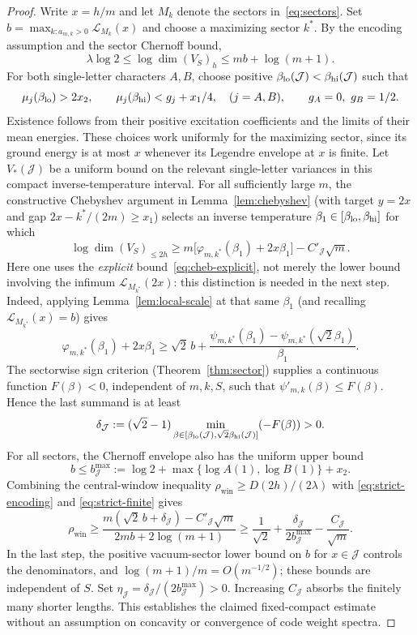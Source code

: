\documentclass[10pt,a4paper]{article}
\numberwithin{equation}{section}
\theoremstyle{remark}\newtheorem{remark}[theorem]{Remark}\newtheorem{question}[theorem]{Question}
\newcommand{\rhow}{\rho_{\mathrm{win}}}\newcommand{\F}{\mathbb F}\newcommand{\K}{\mathbb K}\newcommand{\Z}{\mathbb Z}\newcommand{\R}{\mathbb R}\newcommand{\cB}{\mathcal L}\newcommand{\wt}{\mathrm{wt}}\newcommand{\dimn}{\operatorname{dim}}\newcommand{\supp}{\operatorname{supp}}
\begin{document}
\begin{proof}
Write $x=h/m$ and let $M_k$ denote the sectors in~\eqref{eq:sectors}. Set
$b=\max_{k:a_{m,k}>0}\cB_{M_k}(x)$ and choose a maximizing
sector $k^*$. By the encoding assumption and the sector Chernoff bound,
\begin{equation}\label{eq:strict-encoding}
\lambda\log2\le\log\dimn(V_S)_h
\le m b+\log(m+1).
\end{equation}
For both single-letter characters $A,B$, choose positive
$\beta_{\rm lo}(\mathcal J)<\beta_{\rm hi}(\mathcal J)$ such that
\[
\mu_j(\beta_{\rm lo})>2x_2,\qquad
\mu_j(\beta_{\rm hi})<g_j+x_1/4,
\quad (j=A,B),\qquad g_A=0,\ g_B=1/2.
\]
Existence follows from their positive excitation coefficients and the
limits of their mean energies. These choices work uniformly for the
maximizing sector, since its ground energy is at most $x$ whenever
its Legendre envelope at $x$ is finite. Let $V_*(\mathcal J)$ be a
uniform bound on the relevant single-letter variances in this compact
inverse-temperature interval. For all sufficiently large $m$, the constructive Chebyshev argument
in Lemma~\ref{lem:chebyshev} (with target $y=2x$ and gap
$2x-k^*/(2m)\ge x_1$) selects an inverse temperature
$\beta_1\in[\beta_{\rm lo},\beta_{\rm hi}]$ for which
\begin{equation}\label{eq:strict-finite}
\log\dimn(V_S)_{\le2h}\ge
m\bigl[\varphi_{m,k^*}(\beta_1)+2x\beta_1\bigr]
-C'_{\mathcal J}\sqrt m.
\end{equation}
Here one uses the \emph{explicit} bound~\eqref{eq:cheb-explicit},
not merely the lower bound involving the infimum
$\cB_{M_{k^*}}(2x)$: this distinction is needed in the next step.
Indeed, applying Lemma~\ref{lem:local-scale} at that same $\beta_1$
(and recalling $\cB_{M_{k^*}}(x)=b$) gives
\[
\varphi_{m,k^*}(\beta_1)+2x\beta_1
\ge\sqrt2\,b+
\frac{\psi_{m,k^*}(\beta_1)-\psi_{m,k^*}(\sqrt2\beta_1)}{\beta_1}.
\]
The sectorwise sign criterion (Theorem~\ref{thm:sector}) supplies a
continuous function $F(\beta)<0$, independent of $m,k,S$, such that
$\psi'_{m,k}(\beta)\le F(\beta)$. Hence the last summand is at least
\[
\delta_{\mathcal J}:=(\sqrt2-1)
\min_{\beta\in[\beta_{\rm lo}(\mathcal J),\sqrt2\beta_{\rm hi}(\mathcal J)]}
(-F(\beta))>0.
\]
For all sectors, the Chernoff envelope also has the uniform upper bound
\[
b\le b_{\mathcal J}^{\max}:=\log 2+
\max\{\log A(1),\log B(1)\}+x_2.
\]
Combining the central-window inequality
$\rhow\ge D(2h)/(2\lambda)$ with
\eqref{eq:strict-encoding} and \eqref{eq:strict-finite} gives
\[
\rhow\ge\frac{m(\sqrt2\,b+\delta_{\mathcal J})-
C'_{\mathcal J}\sqrt m}{2mb+2\log(m+1)}
\ge\frac1{\sqrt2}+\frac{\delta_{\mathcal J}}{2b_{\mathcal J}^{\max}}
-\frac{C_{\mathcal J}}{\sqrt m}.
\]
In the last step, the positive vacuum-sector lower bound on $b$
for $x\in\mathcal J$ controls the denominators, and
$\log(m+1)/m=O(m^{-1/2})$; these bounds are independent of $S$.
Set $\eta_{\mathcal J}=\delta_{\mathcal J}/(2b_{\mathcal J}^{\max})>0$.
Increasing $C_{\mathcal J}$ absorbs the finitely many shorter lengths.
This establishes the claimed fixed-compact estimate without an
assumption on concavity or convergence of code weight spectra.
\end{proof}
\end{document}
